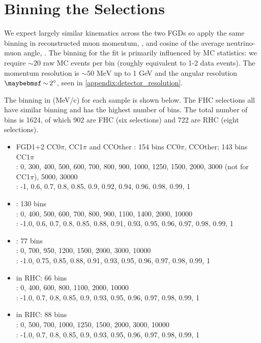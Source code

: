 \section{Binning the Selections}
\label{sec:binning_2017}
We expect largely similar kinematics across the two FGDs so apply the same binning in reconstructed muon momentum, \pmu, and cosine of the average neutrino-muon angle, \cosmu. The binning for the fit is primarily influenced by MC statistics: we require $\sim 20$ raw MC events per bin (roughly equivalent to 1-2 data events). The momentum resolution is $\sim50\text{ MeV}$ up to 1 GeV and the angular resolution $\sim 2\degree$, seen in \autoref{appendix:detector_resolution}.

The binning in \pmu (MeV/c) \cosmu for each sample is shown below. The FHC selections all have similar binning and has the highest number of bins. The total number of bins is 1624, of which 902 are FHC (six selections) and 722 are RHC (eight selections).
\begin{itemize}
	\item FGD1+2  CC$0\pi$, CC1$\pi$ and CCOther \numu: 154 bins CC0$\pi$, CCOther; 143 bins CC1$\pi$\\
	\pmu: 0, 300, 400, 500, 600, 700, 800, 900, 1000, 1250, 1500, 2000, 3000 (not for CC1$\pi$), 5000, 30000\\
	\cosmu:  -1, 0.6, 0.7, 0.8, 0.85, 0.9, 0.92, 0.94, 0.96, 0.98, 0.99, 1
	
	\item {}: 130 bins\\
	\pmu: 0, 400, 500, 600, 700, 800, 900, 1100, 1400, 2000, 10000\\
	\cosmu: -1.0, 0.6, 0.7, 0.8, 0.85, 0.88, 0.91, 0.93, 0.95, 0.96, 0.97, 0.98, 0.99, 1
	
	\item {}: 77 bins \\
	\pmu: 0, 700, 950, 1200, 1500, 2000, 3000, 10000\\
	\cosmu: -1.0, 0.75, 0.85, 0.88, 0.91, 0.93, 0.95, 0.96, 0.97, 0.98, 0.99, 1
	
	\item {} in RHC: 66 bins\\
	\pmu: 0, 400, 600, 800, 1100, 2000, 10000 \\
	\cosmu: -1.0, 0.7, 0.8, 0.85, 0.9, 0.93, 0.95, 0.96, 0.97, 0.98, 0.99, 1
	
	\item {} in RHC: 88 bins\\
	\pmu: 0, 500, 700, 1000, 1250, 1500, 2000, 3000, 10000\\
	\cosmu: -1.0, 0.7, 0.8, 0.85, 0.9, 0.93, 0.95, 0.96, 0.97, 0.98, 0.99, 1
\end{itemize}